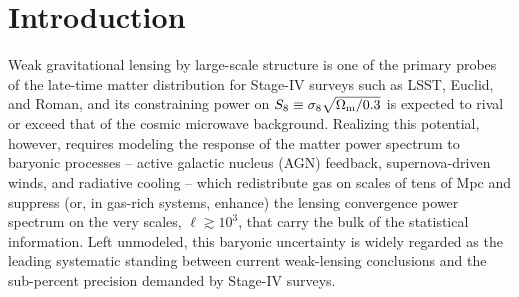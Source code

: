 \documentclass[11pt]{article}
\begin{document}
\begin{abstract}
$\ell_{\rm max}=2000$--3000, but at $\ell_{\rm max}=5000$ it continues to fall by a
further $2.1\times$ ($N=6$) to $3.5\times$ ($N=10$), in all cases well inside the
noise floor this suite can resolve. %
An independent geometric analysis of ten weak-lensing and thermal-Sunyaev-Zel'dovich
(tSZ) summary statistics shows that every well-measured statistic's feedback
response lives on the same $\lesssim2$--$3$-dimensional manifold, and this
two-dimensional structure is independently corroborated by a variational-autoencoder
latent-space analysis of the same suite \citep[Paper~III]{bindIII} and by the
unrelated method of \citet{lin2026} on a different simulation summary. %
We present this two-template basis, its held-out validation, and the manifold
geometry that explains why two numbers suffice, together with an appendix
demonstrating the feasibility of extending the underlying Sobol design to
varying cosmology via Angulo-White rescaling.
\end{abstract}

\section{Introduction}\label{sec:intro}

Weak gravitational lensing by large-scale structure is one of the primary probes
of the late-time matter distribution for Stage-IV surveys such as LSST, Euclid,
and Roman, and its constraining power on $S_8\equiv\sigma_8\sqrt{\Omega_{\rm
m}/0.3}$ is expected to rival or exceed that of the cosmic microwave background.
Realizing this potential, however, requires modeling the response of the matter
power spectrum to baryonic processes -- active galactic nucleus (AGN) feedback,
supernova-driven winds, and radiative cooling -- which redistribute gas on
scales of tens of Mpc and suppress (or, in gas-rich systems, enhance) the
lensing convergence power spectrum on the very scales, $\ell\gtrsim10^3$, that
carry the bulk of the statistical information. Left unmodeled, this baryonic
uncertainty is widely regarded as the leading systematic standing between
current weak-lensing conclusions and the sub-percent precision demanded by
Stage-IV surveys.
\end{document}
